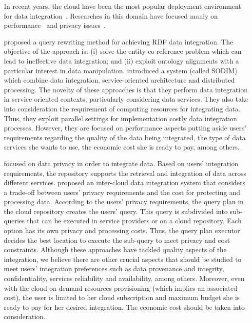In recent years, the cloud have been the most popular deployment environment for data integration~\cite{Carvalho2015}.
Researches in this domain have focused manly on performance~\cite{Correndo2010,ElSheikh2013} and privacy issues~\cite{Tian2010,YauY08}. 

\cite{Correndo2010} proposed a query rewriting method for achieving RDF data integration. The objective of the approach is: (i) solve the entity co-reference problem which can lead to ineffective data integration; and (ii) exploit ontology alignments with a particular interest in data manipulation. \cite{ElSheikh2013} introduced a system (called SODIM) which combine data integration, service-oriented architecture and distributed processing. The novelty of these approaches is that they perform data integration in service oriented contexts, particularly considering data services. They also take into consideration the requirement of computing resources for integrating data. Thus, they exploit parallel settings for implementation costly data integration processes. However, they are focused on performance aspects putting aside users' requirements regarding the quality of the data being integrated, the type of data services she wants to use, the economic cost she is ready to pay, among others.

\cite{YauY08} focused on data privacy in order to integrate data. Based on users' integration requirements, the repository supports the retrieval and integration of data across different services. 
\cite{Tian2010} proposed an inter-cloud data integration system that considers a trade-off between users' privacy requirements and the cost for protecting and processing data. According to the users' privacy requirements, the query plan in the cloud repository creates the users' query. This query is subdivided into sub-queries that can
be executed in service providers or on a cloud repository. Each option has its own  privacy and processing costs.
Thus, the query plan executor decides the best location to execute the sub-query to meet privacy and cost constraints. Although these approaches have tackled quality aspects of the integration, we believe there are other crucial aspects that should be studied to meet users' integration preferences such as data provenance and integrity, confidentiality, services reliability and availability, among others. Moreover, even with the cloud on-demand resources provisioning (which implies an  associated cost), the user is limited to her cloud subscription and maximum budget she is ready to pay for her desired integration. The economic cost should be taken into consideration.

